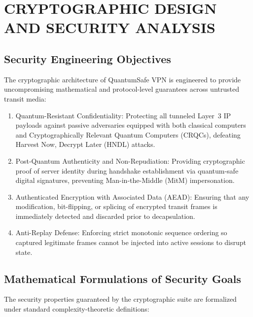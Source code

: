 
\chapter{CRYPTOGRAPHIC DESIGN AND SECURITY ANALYSIS}
\label{chap:security_analysis}

\section{Security Engineering Objectives}
\label{sec:security_objectives}

The cryptographic architecture of QuantumSafe VPN is engineered to provide uncompromising mathematical and protocol-level guarantees across untrusted transit media:
\begin{enumerate}
    \item Quantum-Resistant Confidentiality: Protecting all tunneled Layer~3 IP payloads against passive adversaries equipped with both classical computers and Cryptographically Relevant Quantum Computers (CRQCs), defeating Harvest Now, Decrypt Later (HNDL) attacks.
    \item Post-Quantum Authenticity and Non-Repudiation: Providing cryptographic proof of server identity during handshake establishment via quantum-safe digital signatures, preventing Man-in-the-Middle (MitM) impersonation.
    \item Authenticated Encryption with Associated Data (AEAD): Ensuring that any modification, bit-flipping, or splicing of encrypted transit frames is immediately detected and discarded prior to decapsulation.
    \item Anti-Replay Defense: Enforcing strict monotonic sequence ordering so captured legitimate frames cannot be injected into active sessions to disrupt state.
\end{enumerate}

\section{Mathematical Formulations of Security Goals}
\label{sec:math_formulations_security}

The security properties guaranteed by the cryptographic suite are formalized under standard complexity-theoretic definitions:

